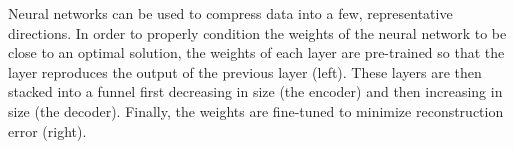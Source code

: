 Neural networks can be used to compress data into a few, representative directions. In order to properly condition the weights of the neural network to be close to an optimal solution, the weights of each layer are pre-trained so that the layer reproduces the output of the previous layer (left). These layers are then stacked into a funnel first decreasing in size (the encoder) and then increasing in size (the decoder). Finally, the weights are fine-tuned to minimize reconstruction error (right). \label{fig:stacked_rbms}